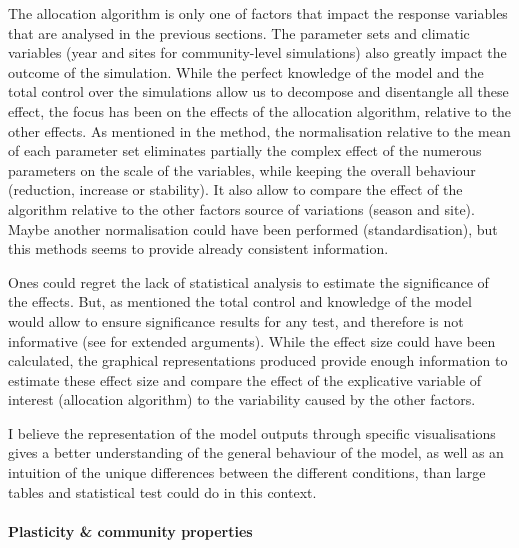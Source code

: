 The allocation algorithm is only one of factors that impact the response variables that are analysed in the previous sections. The parameter sets and climatic variables (year and sites for community-level simulations) also greatly impact the outcome of the simulation. While the perfect knowledge of the model and the total control over the simulations allow us to decompose and disentangle all these effect, the focus has been on the effects of the allocation algorithm, relative to the other effects. As mentioned in the method, the normalisation relative to the mean of each parameter set eliminates partially the complex effect of the numerous parameters on the scale of the variables, while keeping the overall behaviour (reduction, increase or stability). It also allow to compare the effect of the algorithm relative to the other factors source of variations (season and site). Maybe another normalisation could have been performed (standardisation), but this methods seems to provide already consistent information.

Ones could regret the lack of statistical analysis to estimate the significance of the effects. But, as mentioned the total control and knowledge of the model would allow to ensure significance results for any test, and therefore is not informative (see \citet{white_ecologists_2014} for extended arguments). While the effect size could have been calculated, the graphical representations produced provide enough information to estimate these effect size and compare the effect of the explicative variable of interest (allocation algorithm) to the variability caused by the other factors. 

I believe the representation of the model outputs through specific visualisations gives a better understanding of the general behaviour of the model, as well as an intuition of the unique differences between the different conditions, than large tables and statistical test could do in this context. \\

\paragraph{Plasticity \& community properties}


